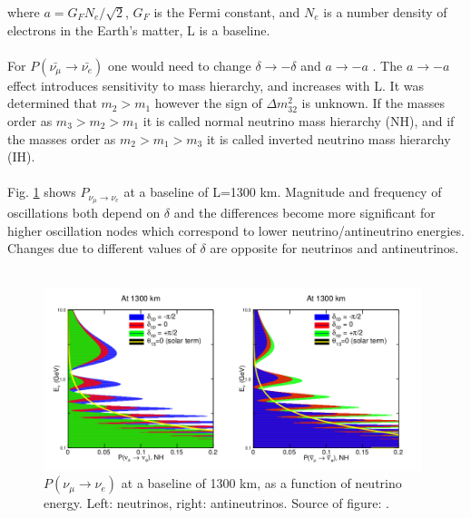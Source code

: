 where $a={G_F}{N_e}/\sqrt{2}$, $G_F$ is the Fermi constant, and $N_e$ is a number density of electrons in the Earth's matter, L is a baseline.\\ \\
For $P(\bar{\nu_\mu} \rightarrow \bar{\nu_e})$ one would need to change $\delta \rightarrow -\delta$ and $a \rightarrow -a$ \cite{ref_theory_Osc}. The $a \rightarrow -a$ effect introduces sensitivity to mass hierarchy, and increases with L. It was determined that $m_2>m_1$ however the sign of ${\Delta}m_{32}^2$ is unknown. If the masses order as $m_3 > m_2 > m_1$ it is called normal neutrino mass hierarchy (NH), and if the masses order as $m_2 > m_1 > m_3$ it is called inverted neutrino mass hierarchy (IH).\\ \\
Fig. \ref{fig:LBNF_oscProbability} shows $P_{\nu_\mu \rightarrow \nu_e}$ at a baseline of L=1300 km. Magnitude and frequency of oscillations both depend on $\delta$ and the differences become more significant for higher oscillation nodes which correspond to lower neutrino/antineutrino energies. Changes due to different values of $\delta$ are opposite for neutrinos and antineutrinos.\\ \\
\begin{figure}
\caption{$P(\nu_\mu \rightarrow \nu_e)$ at a baseline of 1300 km, as a function of neutrino energy. Left: neutrinos, right: antineutrinos. Source of figure: \cite{ref_LBNF_CDR}.}
\label{fig:LBNF_oscProbability}
\centering
\includegraphics[width=0.98\textwidth, keepaspectratio=true]{figs/LBNF_oscProbability.png} 
\end{figure}

